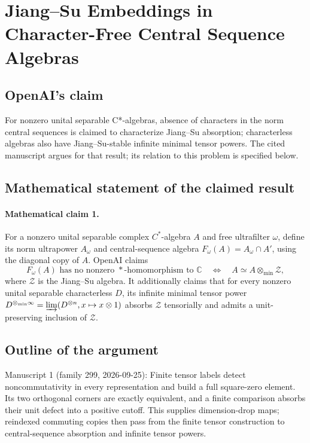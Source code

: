 \documentclass[11pt]{article}
\begin{document}
\section*{Jiang–Su Embeddings in Character-Free Central Sequence Algebras}

\subsection{OpenAI's claim}
For nonzero unital separable C*-algebras, absence of characters in the norm central sequences is claimed to characterize Jiang--Su absorption; characterless algebras also have Jiang--Su-stable infinite minimal tensor powers. The cited manuscript argues for that result; its relation to this problem is specified below.

\subsection{Mathematical statement of the claimed result}
\paragraph{Mathematical claim 1.} For a nonzero unital separable complex $C^*$-algebra $A$ and free ultrafilter $\omega$, define its norm ultrapower $A_\omega$ and central-sequence algebra $F_\omega(A)=A_\omega\cap A'$, using the diagonal copy of $A$. OpenAI claims
\[
F_\omega(A)\text{ has no nonzero }*\text{-homomorphism to }\mathbb C
\quad\Longleftrightarrow\quad A\simeq A\otimes_{\min}\mathcal Z,
\]
where $\mathcal Z$ is the Jiang--Su algebra. It additionally claims that for every nonzero unital separable characterless $D$, its infinite minimal tensor power $D^{\otimes_{\min}\infty}=\varinjlim(D^{\otimes n},x\mapsto x\otimes1)$ absorbs $\mathcal Z$ tensorially and admits a unit-preserving inclusion of $\mathcal Z$.

\subsection{Outline of the argument}
Manuscript 1 (family 299, 2026-09-25): Finite tensor labels detect noncommutativity in every representation and build a full square-zero element. Its two orthogonal corners are exactly equivalent, and a finite comparison absorbs their unit defect into a positive cutoff. This supplies dimension-drop maps; reindexed commuting copies then pass from the finite tensor construction to central-sequence absorption and infinite tensor powers.
\end{document}
